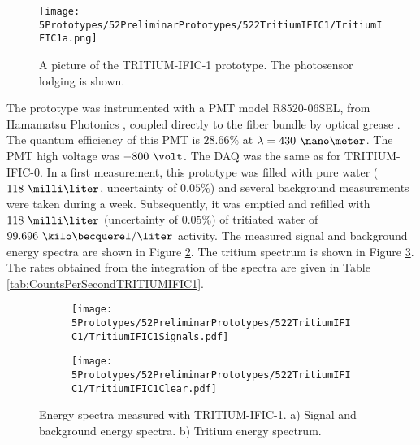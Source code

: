 \begin{figure}[h]
\centering
\texttt{[image: 5Prototypes/52PreliminarPrototypes/522TritiumIFIC1/TritiumIFIC1a.png]}
\caption{A picture of the TRITIUM-IFIC-1 prototype. The photosensor lodging is shown.\label{fig:TritumIFIC1}}
\end{figure}
The prototype was instrumented with a PMT model R8520-06SEL, from Hamamatsu Photonics \cite{DataSheetPMTs}, coupled directly to the fiber bundle by optical grease \cite{OpticalGrease}. The quantum efficiency of this PMT is $28.66\%$ at $\lambda=430~\nano\meter$.  The PMT high voltage was $-800~\volt$. The DAQ was the same as for TRITIUM-IFIC-0. In a first measurement, this prototype was filled with pure water ($118~\milli\liter$, uncertainty of $0.05\%$) and several background measurements were taken during a week. Subsequently, it was emptied and refilled with $118~\milli\liter$ (uncertainty of $0.05\%$) of tritiated water of $99.696~\kilo\becquerel/\liter$ activity. The measured signal and background energy spectra are shown in Figure \ref{subfig:SignalBackgroundEnergySpectraTritiumIFIC1}. The tritium spectrum is shown in Figure \ref{subfig:TritiumEnergySpectraTritiumIFIC1}. The rates obtained from the integration of the spectra are given in Table \ref{tab:CountsPerSecondTRITIUMIFIC1}. 

\begin{figure}
\centering
    \begin{subfigure}[b]{1\textwidth}
    \centering
    \texttt{[image: 5Prototypes/52PreliminarPrototypes/522TritiumIFIC1/TritiumIFIC1Signals.pdf]}  
    \caption{\label{subfig:SignalBackgroundEnergySpectraTritiumIFIC1}}
    \end{subfigure}
    \hfill
    \begin{subfigure}[b]{1\textwidth}
    \centering
    \texttt{[image: 5Prototypes/52PreliminarPrototypes/522TritiumIFIC1/TritiumIFIC1Clear.pdf]}  
    \caption{\label{subfig:TritiumEnergySpectraTritiumIFIC1}}
    \end{subfigure}
 \caption{Energy spectra measured with TRITIUM-IFIC-1. a) Signal and background energy spectra. b) Tritium energy spectrum.}
 \label{fig:EnergySpectraTRITIUMIFIC1}
\end{figure}

